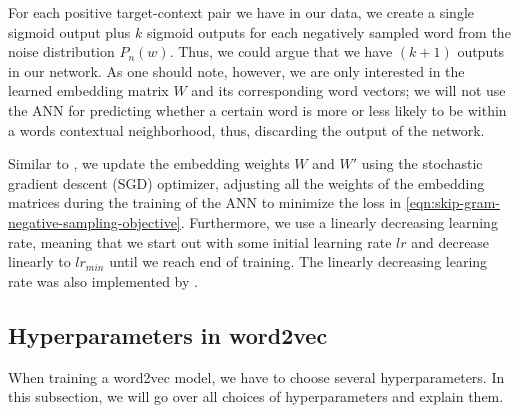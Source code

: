 For each positive target-context pair we have in our data, we create a single sigmoid output plus $k$ sigmoid outputs for each negatively sampled word from the noise distribution $P_n(w)$. Thus, we could argue that we have $(k + 1)$ outputs in our network. As one should note, however, we are only interested in the learned embedding matrix $W$ and its corresponding word vectors; we will not use the ANN for predicting whether a certain word is more or less likely to be within a words contextual neighborhood, thus, discarding the output of the network.

Similar to \cite{mikolov2013a}, we update the embedding weights $W$ and $W'$ using the stochastic gradient descent (SGD) optimizer, adjusting all the weights of the embedding matrices during the training of the ANN to minimize the loss in \cref{eqn:skip-gram-negative-sampling-objective}. Furthermore, we use a linearly decreasing learning rate, meaning that we start out with some initial learning rate $lr$ and decrease linearly to $lr_{min}$ until we reach end of training. The linearly decreasing learing rate was also implemented by \cite{mikolov2013a}.

\subsection{Hyperparameters in word2vec}
When training a word2vec model, we have to choose several hyperparameters. In this subsection, we will go over all choices of hyperparameters and explain them.

